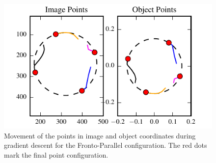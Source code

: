 \documentclass[letterpaper, 10 pt, conference]{ieeeconf}  %
\begin{document}
\begin{figure}[t]
  \begin{center}
    \showthe\columnwidth %
    \includegraphics[width=\columnwidth]{img/image_control_points.pdf}
    \caption{\label{fig:homography_results} Movement of the points in image and object coordinates during gradient descent for the Fronto-Parallel configuration. The red dots mark the final point configuration.}
  \end{center}
\end{figure}
\end{document}
